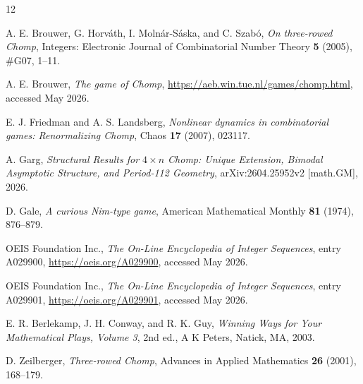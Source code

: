 \documentclass[11pt]{article}
\begin{document}
\begin{thebibliography}{12}

A. E. Brouwer, G. Horv\'ath, I. Moln\'ar-S\'aska, and C. Szab\'o,
\emph{On three-rowed Chomp}, Integers: Electronic Journal of Combinatorial
Number Theory \textbf{5} (2005), \#G07, 1--11.

A. E. Brouwer,
\emph{The game of Chomp},
\url{https://aeb.win.tue.nl/games/chomp.html}, accessed May 2026.

E. J. Friedman and A. S. Landsberg,
\emph{Nonlinear dynamics in combinatorial games: Renormalizing Chomp},
Chaos \textbf{17} (2007), 023117.

A. Garg,
\emph{Structural Results for $4\times n$ Chomp: Unique Extension, Bimodal
Asymptotic Structure, and Period-112 Geometry},
arXiv:2604.25952v2 [math.GM], 2026.

D. Gale,
\emph{A curious Nim-type game},
American Mathematical Monthly \textbf{81} (1974), 876--879.

OEIS Foundation Inc.,
\emph{The On-Line Encyclopedia of Integer Sequences}, entry A029900,
\url{https://oeis.org/A029900}, accessed May 2026.

OEIS Foundation Inc.,
\emph{The On-Line Encyclopedia of Integer Sequences}, entry A029901,
\url{https://oeis.org/A029901}, accessed May 2026.

E. R. Berlekamp, J. H. Conway, and R. K. Guy,
\emph{Winning Ways for Your Mathematical Plays, Volume 3}, 2nd ed.,
A K Peters, Natick, MA, 2003.

D. Zeilberger,
\emph{Three-rowed Chomp},
Advances in Applied Mathematics \textbf{26} (2001), 168--179.

\end{thebibliography}
\end{document}
